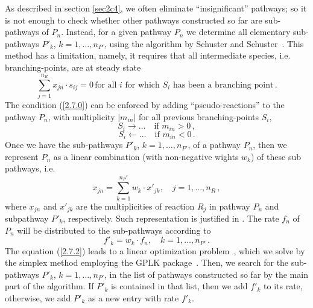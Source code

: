 As described in section \ref{sec2c4}, we often eliminate ``insignificant'' pathways; so it is not enough to check whether other pathways constructed so far are sub-pathways of $P_n$.  Instead, for a given pathway $P_n$ we determine all elementary sub-pathways $P'_k$, $k=1,\ldots,n_{P'}$, using the algorithm by Schuster and Schuster~\cite{Sch1993, Lehman2003}. This method has a limitation, namely, it requires that all intermediate species, i.e. branching-points, are at steady state
\begin{equation}
\sum_{j=1}^{n_R} x_{jn}\cdot s_{ij} = 0 \, \textrm{for all } i\textrm{ for which } S_i \textrm{ has been a branching point}\,.
\label{2.7.0}
\end{equation}
The condition (\ref{2.7.0}) can be enforced by adding ``pseudo-reactions'' to the pathway $P_n$, with multiplicity $|m_{in}|$ for all previous branching-points $S_i$,
\begin{equation}
S_i \rightarrow\ldots \quad \textrm{if } m_{in}>0 \,,
\label{2.7.1}
\end{equation}
\begin{equation}
S_i \leftarrow\ldots \quad \textrm{if } m_{in}<0\,.
\label{2.7.1.1}
\end{equation}
Once we have the sub-pathways $P'_k$, $k=1,\ldots,n_{P'}$, of a pathway $P_n$, then we represent $P_n$ as a linear combination (with non-negative wights $w_k$) of these sub pathways, i.e.
\begin{equation}
x_{jn}=\sum_{k=1}^{n_P'} w_k\cdot x'_{jk}, \quad j =1,\ldots, n_R\,,
\label{2.7.2}
\end{equation}
where $x_{jn}$ and $x'_{jk}$  are the multiplicities of reaction $R_j$ in pathway $P_n$ and subpathway $P'_k$, respectively. Such representation is justified in \cite{Sch2002}. The rate $f_n$ of $P_n$ will be distributed to the sub-pathways according to 
\begin{equation}
f'_k = w_k \cdot f_n, \quad k=1,\ldots , n_{P'}\,.
\label{2.7.3}
\end{equation}
The equation (\ref{2.7.2}) leads to a linear optimization problem~\cite{Lehman2003}, which we solve by the simplex method employing the GPLK package~\cite{Glpk}. Then, we search for the sub-pathways $P'_k$, $k=1,\ldots , n_{P'}$, in the list of pathways constructed so far by the main part of the algorithm. If $P'_k$ is contained in that list, then we add $f'_k$ to its rate, otherwise, we add $P'_k$ as a new entry with rate $f'_k$.



























